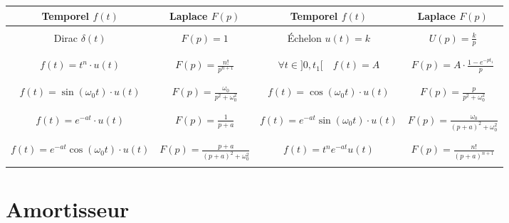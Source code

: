 \begin{center}
\begin{tabular}{|c|c||c|c|}
\hline
Temporel $f(t)$ & Laplace $F(p)$ & 
Temporel $f(t)$ & Laplace $F(p)$ \\
\hline
\hline
 &&& \\
Dirac $\delta(t)$ &
$F(p)=1$ &
Échelon $ u(t)=k $&
$ U(p) = \frac{k}{p}$
\\
&&& \\
\hline
&&& \\
$f(t) = t^n\cdot u(t)$ &
$F(p)=\frac{n!}{p^{n+1}} $ &
$\forall t\in ]0,t_1 [ \quad f(t)= A$ & 
$F(p) =A \cdot \frac{1-e^{-pt_1}}{p} $\\
&&& \\
\hline
&&& \\
$f(t) = \sin \left( \omega_0 t\right) \cdot u(t)$ &
$F(p) = \frac{\omega_0}{p^2+\omega_0^2} $ &
$f(t) = \cos \left( \omega_0 t\right) \cdot u(t)$ & 
$F(p) = \frac{p}{p^2+\omega_0^2} $ \\
&&& \\
\hline
&&& \\
$f(t)= e^{-at}\cdot u(t)$ & 
$F(p)= \frac{1}{p+a}$ &
$f(t) = e^{-at}\sin\left( \omega_0 t\right) \cdot u(t)$ &
$F(p)=\frac{\omega_0}{\left( p+a\right)^2 + \omega_0^2}$  \\
&&& \\
\hline
&&& \\
$f(t) = e^{-at}\cos\left( \omega_0 t\right) \cdot u(t)$ &
$F(p)=\frac{p+a}{\left( p+a\right)^2 + \omega_0^2}$  &
$f(t)=t^ne^{-at}u(t)$ & $F(p)=\frac{n!}{\left( p+a\right)^{n+1}}$ \\
&&& \\
\hline
\end{tabular}
\end{center}

\newpage

\section{Amortisseur}

